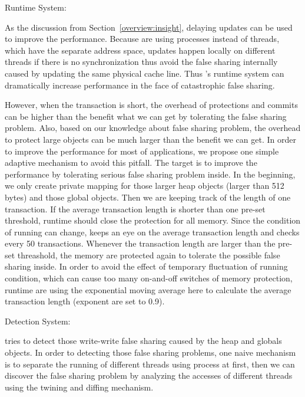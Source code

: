 \sheriff{} Runtime System:

As the discussion from Section~\ref{overview:insight}, delaying updates can be used to improve the performance. 
Because \sheriff{} are using processes instead of threads, 
which have the separate address space, updates happen locally on different threads if there is no synchronization thus 
avoid the false sharing internally caused by updating the same physical cache line. 
Thus \sheriff{}'s runtime system can dramatically increase performance in the face of catastrophic false 
sharing.

However, when the transaction is short, 
the overhead of protections and commits can be higher than the benefit what we can get 
by tolerating the false sharing problem. 
Also, based on our knowledge about false sharing problem, the overhead to protect large objects 
can be much larger than the benefit we can get. 
In order to improve the performance for most of applications, we propose one simple adaptive mechanism to avoid this pitfall.
The target is to improve the performance by tolerating serious false sharing problem inside.
In the beginning, we only create private mapping for those larger heap objects (larger than 512 bytes) and those global objects. 
Then we are keeping track of the length of one transaction. 
If the average transaction length is shorter than one pre-set threshold, 
\sheriff{} runtime should close the protection for all memory.
Since the condition of running can change, \sheriff{} keeps an eye on the average transaction length and 
checks every 50 transactions.
Whenever the transaction length are larger than the pre-set threashold, the memory are protected again to
tolerate the possible false sharing inside. 
In order to avoid the effect of temporary fluctuation of running condition, 
which can cause too many on-and-off switches of memory protection, 
\sheriff{} runtime are using the exponential moving average here
to calculate the average transaction length (exponent are set to 0.9).


\sheriff{} Detection System:

\sheriff{} tries to detect those write-write false sharing caused by the heap and globals objects.
In order to detecting those false sharing problems, one naive mechanism is to separate the running of 
different threads using process at first, then we can discover the false sharing problem
by analyzing the accesses of different threads using the twining and diffing mechanism. 

